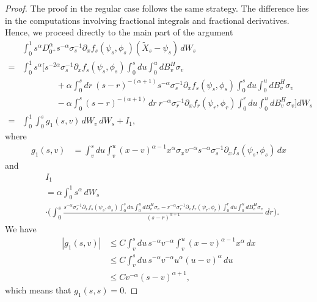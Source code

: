 \documentclass[10pt,a4paper]{amsart}
\begin{document}
\begin{proof}
  The proof in the regular case follows the same strategy.  The  difference lies in the computations involving fractional integrals and fractional derivatives. Hence, we proceed directly to the main part of the argument
\begin{align*}
&\int_0^1 s^{\alpha}D^\alpha_{0^+} s^{-\alpha} \sigma_s^{-1} \partial_x f_s(\psi_s, \phi_s)(\tilde{X}_s - \psi_s) \, dW_s\\
    =& \int_0^1 s^\alpha \Bigg[ s^{-2\alpha} \sigma_s^{-1} \partial_x f_s(\psi_s, \phi_s) \int_0^s du \int_0^u dB^H_v \sigma_v \\
    &\qquad\qquad + \alpha \int_0^s dr\ (s - r)^{-(\alpha + 1)} s^{-\alpha} \sigma_s^{-1} \partial_x f_s(\psi_s, \phi_s) \int_0^s du \int_0^u dB^H_v \sigma_v  \\
     &\qquad\qquad - \alpha \int_0^s (s - r)^{-(\alpha + 1)} \, dr\ r^{-\alpha} \sigma_r^{-1} \partial_x f_r(\psi_r, \phi_r) \int_0^r du \int_0^u dB^H_v \sigma_v  \Bigg] dW_s \\
    =& \int_0^1 \int_0^s g_1(s,v) \, dW_v \, dW_s + I_1,
\end{align*}
where
\begin{align*}
    g_1(s,v) &= \int_v^s du \int_v^u (x-v)^{\alpha-1} x^\alpha \sigma_x v^{-\alpha} s^{-\alpha} \sigma_s^{-1} \partial_x f_s(\psi_s, \phi_s) \, dx
\end{align*}
and
\begin{align*}
      &I_1\\
      &= \alpha \int_0^1 s^\alpha \, dW_s \\
    &\cdot\Bigg( \int_0^s \frac{s^{-\alpha} \sigma_s^{-1} \partial_x f_s(\psi_s, \phi_s) \int_0^s du \int_0^u dB^H_v \sigma_v - r^{-\alpha} \sigma_r^{-1} \partial_x f_r(\psi_r, \phi_r) \int_0^r du \int_0^u dB^H_v \sigma_v}{(s - r)^{\alpha + 1}} \, dr\Bigg).
\end{align*}
We have
\begin{align*}
    |g_1(s,v)| &\leq C \int_v^s du \, s^{-\alpha} v^{-\alpha} \int_v^u (x-v)^{\alpha-1} x^\alpha \, dx \\
    &\leq C \int_v^s du \, s^{-\alpha} v^{-\alpha} u^\alpha (u-v)^\alpha \, du \\
    &\leq C v^{-\alpha} (s-v)^{\alpha+1},
\end{align*}
which means that \( g_1(s,s) = 0 \).


\end{proof}
\end{document}
